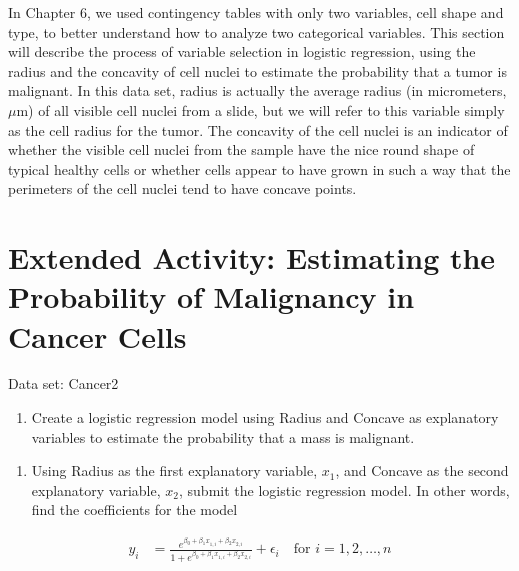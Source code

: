 \documentclass[
]{report}
\providecommand{\tightlist}{%
  \setlength{\itemsep}{0pt}\setlength{\parskip}{0pt}}
\begin{document}
In Chapter 6, we used contingency tables with only two variables, cell shape and type, to better understand how to analyze two categorical variables. This section will describe the process of variable selection in logistic regression, using the radius and the concavity of cell nuclei to estimate the probability that a tumor is malignant. In this data set, radius is actually the average radius (in micrometers, \(\mu\)m) of all visible cell nuclei from a slide, but we will refer to this variable simply as the cell radius for the tumor. The concavity of the cell nuclei is an indicator of whether the visible cell nuclei from the sample have the nice round shape of typical healthy cells or whether cells appear to have grown in such a way that the perimeters of the cell nuclei tend to have concave points.

\hypertarget{extended-activity-estimating-the-probability-of-malignancy-in-cancer-cells-1}{%
\section*{Extended Activity: Estimating the Probability of Malignancy in Cancer Cells}\label{extended-activity-estimating-the-probability-of-malignancy-in-cancer-cells-1}}

Data set: Cancer2

\begin{enumerate}
\def\labelenumi{\arabic{enumi}.}
\setcounter{enumi}{14}
\tightlist
\item
  Create a logistic regression model using Radius and Concave as explanatory variables to estimate the probability that a mass is malignant.\\
\end{enumerate}

\begin{enumerate}
\def\labelenumi{\alph{enumi}.}
\tightlist
\item
  Using Radius as the first explanatory variable, \(x_1\), and Concave as the second explanatory variable, \(x_2\), submit the logistic regression model. In other words, find the coefficients for the model
\end{enumerate}

\begin{align}
   y_i &= \frac{e^{\beta_0 + \beta_1 x_{1,i} + \beta_2 x_{2,i}}}{1 + e^{\beta_0 + \beta_1 x_{1,i} + \beta_2 x_{2,i}}} + \epsilon_i \quad \text{for } i = 1,2,\dots,n
\end{align}
\end{document}

